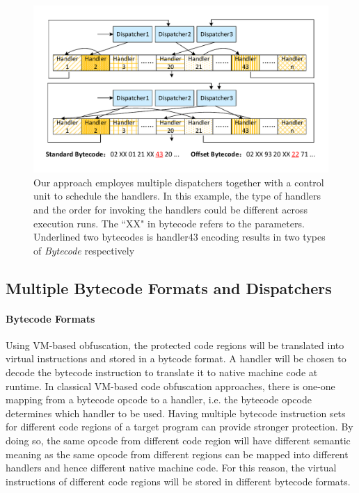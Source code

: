 \documentclass[preprint,12pt,3p]{elsarticle}
\begin{document}
\begin{figure}[!t]
  \centering
  \includegraphics[width=0.7\columnwidth]{figure/figdh.pdf}
  \caption{Our approach employes multiple dispatchers together with a control unit to schedule the handlers. In this example, the type of handlers and the order for invoking the handlers could be different across execution runs. The ``XX" in bytecode refers to the parameters. Underlined two bytecodes is handler43 encoding results in two types of \emph{Bytecode} respectively}\label{fig:Fig.dh}
\end{figure}

\subsection{Multiple Bytecode Formats and Dispatchers}\label{sec:mbd}
\paragraph{Bytecode Formats} Using VM-based obfuscation, the protected code regions will be translated into virtual
instructions and stored in a bytcode format. A handler will
be chosen to decode the bytecode instruction to translate it
to native machine code at runtime.  In classical VM-based
code obfuscation approaches, there is one-one mapping from a
bytecode opcode to a handler, i.e. the bytecode opcode
determines which handler to be used.
Having multiple bytecode instruction sets for different code regions of a target program can provide stronger protection.
By doing so, the same opcode from different code region will have
different semantic meaning as the same opcode from different regions can be mapped into different handlers and hence different
native machine code. For this reason, the virtual instructions
of different code regions will be stored in different bytecode formats.
\end{document}
